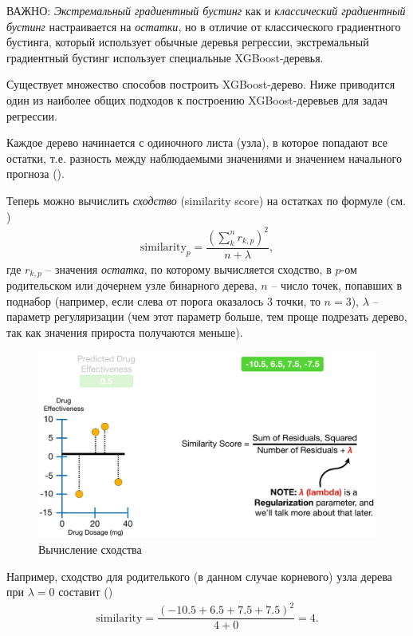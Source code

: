 \documentclass[%
	11pt,
	a4paper,
	utf8,
		]{article}
\begin{document}
ВАЖНО: \emph{Экстремальный градиентный бустинг} как и \emph{классический градиентный бустинг} настраивается на \emph{\color{blue} остатки}, но в отличие от классического градиентного бустинга, который использует обычные деревья регрессии, экстремальный градиентный бустинг использует специальные XGBoost-деревья.

Существует множество способов построить XGBoost-дерево. Ниже приводится один из наиболее общих подходов к построению XGBoost-деревьев для задач регрессии.

Каждое дерево начинается с одиночного листа (узла), в которое попадают все остатки, т.е. разность между наблюдаемыми значениями и значением начального прогноза ().

Теперь можно вычислить \emph{сходство} (similarity score) на остатках по формуле (см. )
\begin{align*}
	\text{similarity}_p = \dfrac{(\sum_{k}^{n} r_{k,p})^2}{n + \lambda},
\end{align*}
где $ r_{k,p} $ -- значения \emph{остатка}, по которому вычисляется сходство, в $ p $-ом родительском или дочернем узле бинарного дерева, $ n $ -- число точек, попавших в поднабор (например, если слева от порога оказалось 3 точки, то $ n = 3 $), $ \lambda $ -- параметр регуляризации (чем этот параметр больше, тем проще подрезать дерево, так как значения прироста получаются меньше).

\begin{figure}[h]
	\centering
	\includegraphics[scale=0.35]{figures/xgboost_similarity.png}
	\caption{ Вычисление сходства }\label{fig:xgboost_similarity}
\end{figure}

Например, сходство для родителького (в данном случае корневого) узла дерева при $ \lambda = 0 $ составит ()
\begin{align*}
	\text{similarity} = \dfrac{ (-10.5 + 6.5 + 7.5 + 7.5)^2 }{ 4 + 0} = 4.
\end{align*}
\end{document}
